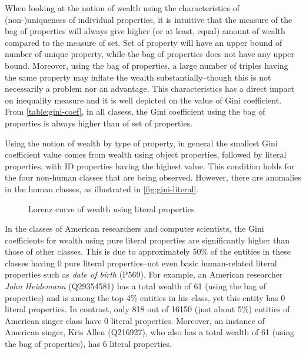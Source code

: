 When looking at the notion of wealth using the characteristics of (non-)uniqueness of individual properties, it is intuitive that the measure of the bag of properties will always give higher (or at least, equal) amount of wealth compared to the measure of set. Set of property will have an upper bound of number of unique property, while the bag of properties does not have any upper bound. Moreover, using the bag of properties, a large number of triples having the same property may inflate the wealth substantially--though this is not necessarily a problem nor an advantage. This characteristics has a direct impact on inequality measure and it is well depicted on the value of Gini coefficient. From \autoref{table:gini-coef}, in all clasess, the Gini coefficient using the bag of properties is always higher than of set of properties.

Using the notion of wealth by type of property, in general the smallest Gini coefficient value comes from wealth using object properties, followed by literal properties, with ID properties having the highest value. This condition holds for the four non-human classes that are being observed. However, there are anomalies in the human classes, as illustrated in \autoref{fig:gini-literal}.

\begin{figure}[!htbp]
    \centering
    \caption{Lorenz curve of wealth using literal properties} \label{fig:gini-literal}
\end{figure}

In the classes of American researchers and computer scientists, the Gini coefficients for wealth using pure literal properties are significantly higher than those of other classes. This is due to approximately 50\% of the entities in these classes having 0 pure literal properties--not even basic human-related literal properties such as \textit{date of birth} (P569). For example, an American researcher \textit{John Heidemann} (Q29354581) has a total wealth of 61 (using the bag of properties) and is among the top 4\% entities in his class, yet this entity has 0 literal properties. In contrast, only 818 out of 16150 (just about 5\%) entities of American singer class have 0 literal properties. Moreover, an instance of American singer, {Kris Allen} (Q216927), who also has a total wealth of 61 (using the bag of properties), has 6 literal properties.

